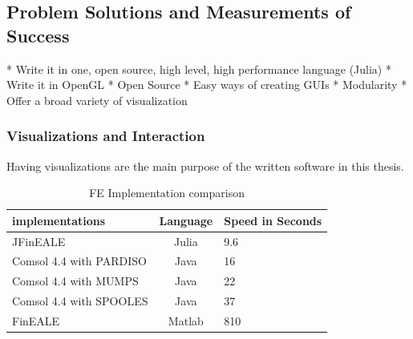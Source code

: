 \subsection{Problem Solutions and Measurements of Success}
* Write it in one, open source, high level, high performance language (Julia)
* Write it in OpenGL
* Open Source
* Easy ways of creating GUIs
* Modularity
* Offer a broad variety of visualization

\subsubsection{Visualizations and Interaction}

Having visualizations are the main purpose of the written software in this thesis.


\begin{table}[htb]
\centering
\caption{FE Implementation comparison}
    \sffamily 
    \begin{tabularx}{1.0\textwidth}{l | c | p{5cm}}
        \hline
        implementations         & Language  & Speed in Seconds \\
        \hline
        JFinEALE                & Julia     & 9.6   \\
        Comsol 4.4 with PARDISO & Java      & 16    \\
        Comsol 4.4 with MUMPS   & Java      & 22    \\ 
        Comsol 4.4 with SPOOLES & Java      & 37    \\ 
        FinEALE                 & Matlab    & 810   \\
        \hline
    \end{tabularx} 
    \normalfont
    \label{table:FEComparison}
\end{table}



